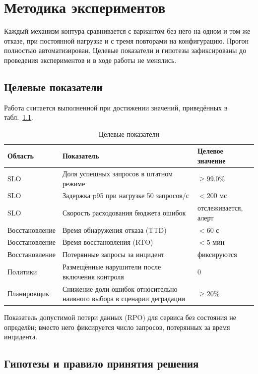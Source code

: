 \chapter{Методика экспериментов}

Каждый механизм контура сравнивается с вариантом без него на одном и том же
отказе, при постоянной нагрузке и с тремя повторами на конфигурацию. Прогон
полностью автоматизирован. Целевые показатели и гипотезы зафиксированы до
проведения экспериментов и в ходе работы не менялись.

\section{Целевые показатели}

Работа считается выполненной при достижении значений, приведённых в
табл.~\ref{tab:targets}.

\begin{table}[ht]
  \centering
  \caption{Целевые показатели}
  \label{tab:targets}
  \small
  \begin{tabularx}{\textwidth}{@{}lXl@{}}
    \toprule
    Область & Показатель & Целевое значение \\
    \midrule
    SLO & Доля успешных запросов в штатном режиме & $\ge 99.0\%$ \\
    SLO & Задержка p95 при нагрузке 50 запросов/с & $< 200$ мс \\
    SLO & Скорость расходования бюджета ошибок & отслеживается, алерт \\
    Восстановление & Время обнаружения отказа (TTD) & $< 60$ с \\
    Восстановление & Время восстановления (RTO) & $< 5$ мин \\
    Восстановление & Потерянные запросы за инцидент & фиксируются \\
    Политики & Размещённые нарушители после включения контроля & 0 \\
    Планировщик & Снижение доли ошибок относительно наивного выбора
      в сценарии деградации & $\ge 20\%$ \\
    \bottomrule
  \end{tabularx}
\end{table}

Показатель допустимой потери данных (RPO) для сервиса без состояния не
определён; вместо него фиксируется число запросов, потерянных за время
инцидента.

\section{Гипотезы и правило принятия решения}

